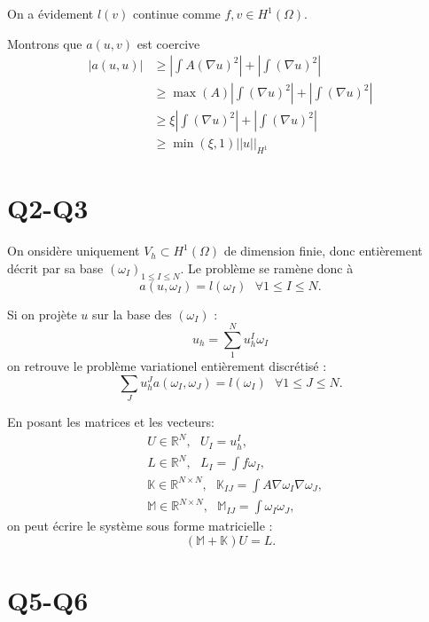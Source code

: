 \documentclass[11pt]{article}
\newcommand{\R}{\mathbb{R}}
\newcommand{\K}{\mathbb{K}}
\newcommand{\M}{\mathbb{M}}
\newcommand{\ms}{~~~}
\newcommand{\norm}[1]{\left|\left|#1\right|\right|}
\begin{document}
On a évidement $l(v)$ continue comme $f, v \in H^1(\Omega)$. 

Montrons que $a(u,v)$ est coercive
\begin{align}
  \label{eq:co}
  |a(u,u)| &\geq \left|\int A (\nabla u)^2 \right| + \left|\int (\nabla u)^2 \right| \\
           &\geq \max(A) \left|\int (\nabla u)^2 \right| + \left|\int (\nabla u)^2 \right| \\
           &\geq \xi \left|\int (\nabla u)^2 \right| + \left|\int (\nabla u)^2 \right| \\
           &\geq \min(\xi,1) \norm{u}_{H^1}
\end{align}

\section{Q2-Q3}

On onsidère uniquement $V_h \subset H^1(\Omega)$ de dimension finie, donc entièrement décrit par sa base $(\omega_I)_{1\leq I \leq N}$. Le problème se ramène donc à
\begin{equation}
  a(u,\omega_I) = l(\omega_I) \ms \forall 1\leq I\leq N.
\end{equation}

Si on projète $u$ sur la base des $(\omega_I)$ :
\begin{equation}
  u_h = \sum_{1}^{N} u_h^I \omega_I
\end{equation}
on retrouve le problème variationel entièrement discrétisé :
\begin{equation}
  \sum_J u_h^J a(\omega_I, \omega_J) = l(\omega_I) \ms \forall  1\leq J\leq N.   
\end{equation}

En posant les matrices et les vecteurs:
\begin{align}
  &U \in \R^{N}, \ms U_{I} = u_h^I, \\
  &L \in \R^{N}, \ms L_{I} = \int f \omega_I, \\
  &\K \in \R^{N\times N},\ms \K_{IJ} = \int A \nabla \omega_I \nabla \omega_J,  \\
  &\M \in \R^{N\times N},\ms \M_{IJ} = \int \omega_I \omega_J,
\end{align}
on peut écrire le système sous forme matricielle :
\begin{equation}
  (\M+\K) U = L.
\end{equation}

\section{Q5-Q6}
\end{document}
